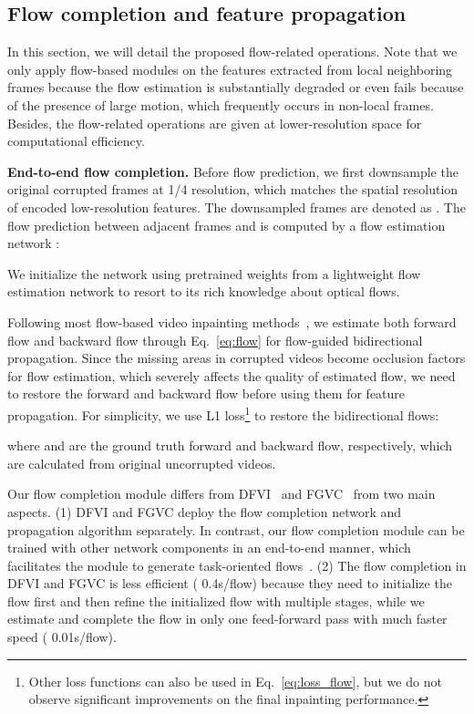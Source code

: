 \documentclass[final]{cvpr}
\newcommand{\subtitle}[1]{\noindent \textbf{#1}}
\begin{document}
\subsection{Flow completion and feature propagation}
\label{sec:flow_alignment}
In this section, we will detail the proposed flow-related operations.
Note that we only apply flow-based modules on the features extracted from local neighboring frames because the flow estimation is substantially degraded or even fails because of the presence of large motion, which frequently occurs in non-local frames.
Besides, the flow-related operations are given at lower-resolution space for computational efficiency.

\subtitle{End-to-end flow completion.}
Before flow prediction, we first downsample the original corrupted frames  at 1/4 resolution, which matches the spatial resolution of encoded low-resolution features.
The downsampled frames are denoted as .
The flow prediction between adjacent frames  and  is computed by a flow estimation network :

We initialize the network using pretrained weights from a lightweight flow estimation network to resort to its rich knowledge about optical flows.

Following most flow-based video inpainting methods~\cite{Gao-ECCV-FGVC,Xu_2019_CVPR}, we estimate both forward flow  and backward flow  through Eq.~\eqref{eq:flow} for flow-guided bidirectional propagation. 
Since the missing areas in corrupted videos become occlusion factors for flow estimation, which severely affects the quality of estimated flow, we need to restore the forward and backward flow before using them for feature propagation.
For simplicity, we use L1 loss\footnote{Other loss functions can also be used in Eq.~\eqref{eq:loss_flow}, but we do not observe significant improvements on the final inpainting performance.} to restore the bidirectional flows:

where  and  are the ground truth forward and backward flow, respectively, which are calculated from original uncorrupted videos.

Our flow completion module differs from DFVI~\cite{Xu_2019_CVPR} and FGVC~\cite{Gao-ECCV-FGVC} from two main aspects.
(1) DFVI and FGVC deploy the flow completion network and propagation algorithm separately. 
In contrast, our flow completion module can be trained with other network components in an end-to-end manner, which facilitates the module to generate task-oriented flows~\cite{xue2019video}.
(2) The flow completion in DFVI and FGVC is less efficient ( 0.4s/flow) because they need to initialize the flow first and then refine the initialized flow with multiple stages,
while we estimate and complete the flow in only one feed-forward pass with much faster speed ( 0.01s/flow).
\end{document}

